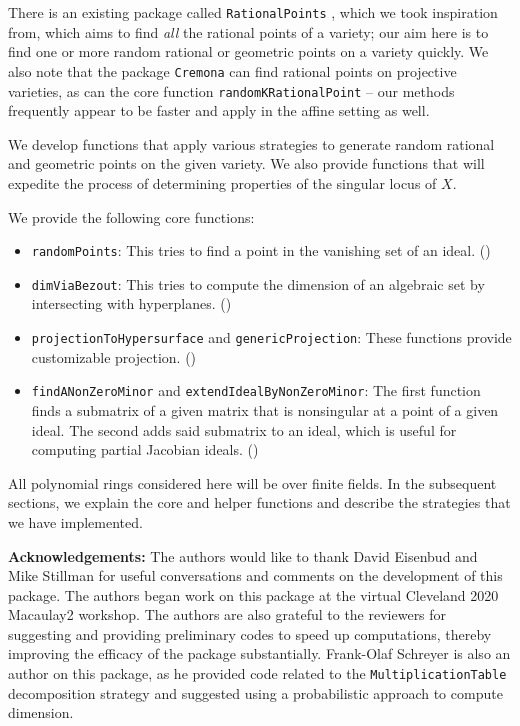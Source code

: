 \documentclass[11pt]{amsart}
\theoremstyle{definition}
\begin{document}
    There is an existing package called {\tt RationalPoints} \cite{RationalPointsSource}, which we took inspiration from, which aims to find \emph{all} the rational points of a variety; our aim here is to find one or more random rational or geometric points on a variety quickly.  We also note that the package {\tt Cremona} \cite{CremonaSource} can find rational points on projective varieties, as can the core function {\tt randomKRationalPoint} \cite{M2} -- our methods frequently appear to be faster and apply in the affine setting as well.

    We develop functions that apply various strategies to generate random rational and geometric points on the given variety. We also provide functions that will expedite the process of determining properties of the singular locus of $X$.%

    We provide the following core functions:
    \begin{itemize}    
    \item {\tt randomPoints}:  This tries to find a point in the vanishing set of an ideal. ()
    \item {\tt dimViaBezout}:  This tries to compute the dimension of an algebraic set by intersecting with hyperplanes.  ()
    \item {\tt projectionToHypersurface} and {\tt genericProjection}: These functions provide customizable projection. () 	
    \item {\tt findANonZeroMinor} and {\tt extendIdealByNonZeroMinor}:  The first function finds a submatrix of a given matrix that is nonsingular at a point of a given ideal.  The second adds said submatrix to an ideal, which is useful for computing partial Jacobian ideals.  ()          
    \end{itemize}

    All polynomial rings considered here will be over finite fields. In the subsequent sections, we explain  the core and helper functions and describe the strategies that we have implemented.

   \vspace{1em}
    \noindent \textbf{Acknowledgements:} The authors would like to thank David Eisenbud and Mike Stillman for useful conversations and comments on the development of this package.  The authors began work on this package at the virtual Cleveland 2020 Macaulay2 workshop. The authors are also grateful to the reviewers for suggesting and providing preliminary codes to speed up computations, thereby improving the efficacy of the package substantially.  Frank-Olaf Schreyer is also an author on this package, as he provided code related to the {\tt MultiplicationTable} decomposition strategy and suggested using a probabilistic approach to compute dimension.
\end{document}
